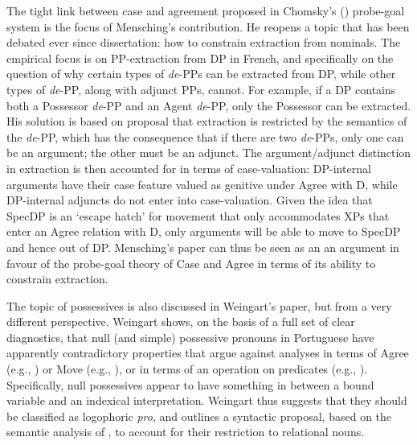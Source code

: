 \documentclass[output=paper]{langsci/langscibook}
\begin{document}
The tight link between case and agreement proposed in Chomsky’s (\citeyear{Chomsky2000,Chomsky2001}) probe-goal system is the focus of Mensching’s contribution. He reopens a topic that has been debated ever since  dissertation: how to constrain extraction from nominals. The empirical focus is on PP-extraction from DP in French, and specifically on the question of why certain types of \textit{de}{}-PPs can be extracted from DP, while other types of \textit{de}{}-PP, along with adjunct PPs, cannot. For example, if a DP contains both a Possessor \textit{de}{}-PP and an Agent \textit{de}{}-PP, only the Possessor can be extracted. His solution is based on  proposal that extraction is restricted by the semantics of the \textit{de}{}-PP, which has the consequence that if there are two \textit{de}{}-PPs, only one can be an argument; the other must be an adjunct. The argument\slash adjunct distinction in extraction is then accounted for in terms of case-valuation: DP-internal arguments have their case feature valued as genitive under Agree with D, while DP-internal adjuncts do not enter into case-valuation. Given the idea that SpecDP is an ‘escape hatch’ for movement that only accommodates XPs that enter an Agree relation with D, only arguments will be able to move to SpecDP and hence out of DP. Mensching’s paper can thus be seen as an an argument in favour of the probe-goal theory of Case and Agree in terms of its ability to constrain extraction.

The topic of possessives is also discussed in Weingart’s paper, but from a very different perspective. Weingart shows, on the basis of a full set of clear diagnostics, that null (and simple) possessive pronouns in Portuguese have apparently contradictory properties that argue against analyses in terms of Agree (e.g., \citealt{Hicks2009}) or Move (e.g., \citealt{Floripi2009,Rodrigues2010}), or in terms of an operation on predicates (e.g., \citealt{Reinhart2006}). Specifically, null possessives appear to have something in between a bound variable and an indexical interpretation. Weingart thus suggests that they should be classified as logophoric \textit{pro}, and outlines a syntactic proposal, based on the semantic analysis of \citet{Partee1997}, to account for their restriction to relational nouns.
\end{document}
